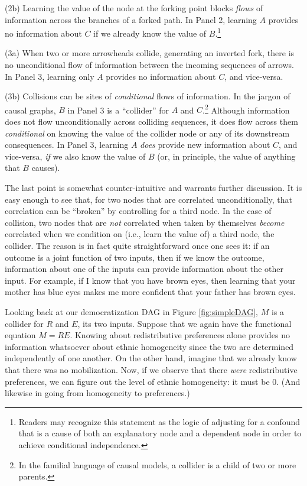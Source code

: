 \documentclass[
  12pt,
]{book}
\begin{document}
(2b) Learning the value of the node at the forking point blocks \emph{flows} of information across the branches of a forked path. In Panel 2, learning \(A\) provides no information about \(C\) if we already know the value of \(B\).\footnote{Readers may recognize this statement as the logic of adjusting for a confound that is a cause of both an explanatory node and a dependent node in order to achieve conditional independence.}

(3a) When two or more arrowheads collide, generating an inverted fork, there is no unconditional flow of information between the incoming sequences of arrows. In Panel 3, learning only \(A\) provides no information about \(C\), and vice-versa.

(3b) Collisions can be sites of \emph{conditional} flows of information. In the jargon of causal graphs, \(B\) in Panel 3 is a ``collider'' for \(A\) and \(C\).\footnote{In the familial language of causal models, a collider is a child of two or more parents.} Although information does not flow unconditionally across colliding sequences, it does flow across them \emph{conditional} on knowing the value of the collider node or any of its downstream consequences. In Panel 3, learning \(A\) \emph{does} provide new information about \(C\), and vice-versa, \emph{if} we also know the value of \(B\) (or, in principle, the value of anything that \(B\) causes).

The last point is somewhat counter-intuitive and warrants further discussion. It is easy enough to see that, for two nodes that are correlated unconditionally, that correlation can be ``broken'' by controlling for a third node. In the case of collision, two nodes that are \emph{not} correlated when taken by themselves \emph{become} correlated when we condition on (i.e., learn the value of) a third node, the collider. The reason is in fact quite straightforward once one sees it: if an outcome is a joint function of two inputs, then if we know the outcome, information about one of the inputs can provide information about the other input. For example, if I know that you have brown eyes, then learning that your mother has blue eyes makes me more confident that your father has brown eyes.

Looking back at our democratization DAG in Figure \ref{fig:simpleDAG}, \(M\) is a collider for \(R\) and \(E\), its two inputs. Suppose that we again have the functional equation \(M=RE\). Knowing about redistributive preferences alone provides no information whatsoever about ethnic homogeneity since the two are determined independently of one another. On the other hand, imagine that we already know that there was no mobilization. Now, if we observe that there \emph{were} redistributive preferences, we can figure out the level of ethnic homogeneity: it must be 0. (And likewise in going from homogeneity to preferences.)
\end{document}
